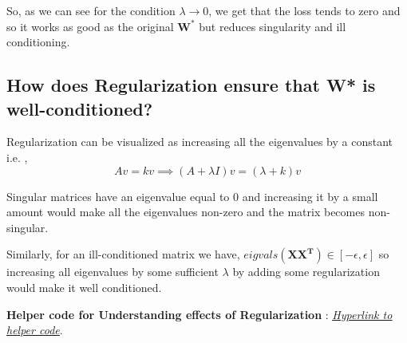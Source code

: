 \documentclass[11pt]{article}
\begin{document}
So, as we can see for the condition $\lambda \rightarrow 0$, we get that the loss tends to zero and so it works as good as the original $\mathbf{W^*}$ but reduces singularity and ill conditioning. 

\subsection{How does Regularization ensure that \textbf{W*} is well-conditioned?}
Regularization can be visualized as increasing all the eigenvalues by a constant i.e. ,
\begin{equation}
    Av = kv \implies (A + \lambda I)v = (\lambda + k)v
\end{equation}

Singular matrices have an eigenvalue equal to 0 and increasing it by a small amount would make all the eigenvalues non-zero and  the matrix becomes non-singular.

Similarly, for an ill-conditioned matrix we have, ${eigvals(\mathbf{X X^T}) \in [-\epsilon,\epsilon]}$ so increasing all eigenvalues by some sufficient ${\lambda}$ by adding some regularization would make it well conditioned.


\textbf{Helper code for Understanding effects of Regularization} : \href{https://colab.research.google.com/drive/1BQGdsfARX5V030_1HJgdRMTezbz7ZbDp?usp=sharing}{\underline{\textit{Hyperlink to helper code}}}.
\end{document}
